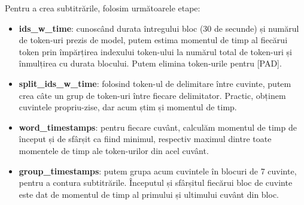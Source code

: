 \par
Pentru a crea subtitrările, folosim următoarele etape:

\begin{itemize}
    \item \textbf{ids\_w\_time}: cunoscând durata întregului bloc (30 de secunde) și numărul de token-uri
    prezis de model, putem estima momentul de timp al fiecărui token prin împărțirea indexului token-ului
    la numărul total de token-uri și înmulțirea cu durata blocului. Putem elimina token-urile pentru [PAD].
    \item \textbf{split\_ids\_w\_time}: folosind token-ul de delimitare între cuvinte, putem crea câte un 
    grup de token-uri între fiecare delimitator. Practic, obținem cuvintele propriu-zise, dar acum știm și
    momentul de timp.
    \item \textbf{word\_timestamps}: pentru fiecare cuvânt, calculăm momentul de timp de început și de sfârșit
    ca fiind minimul, respectiv maximul dintre toate momentele de timp ale token-urilor din acel cuvânt.
    \item \textbf{group\_timestamps}: putem grupa acum cuvintele în blocuri de 7 cuvinte, pentru a contura
    subtitrările. Începutul și sfârșitul fiecărui bloc de cuvinte este dat de momentul de timp al primului
    și ultimului cuvânt din bloc.
\end{itemize}

